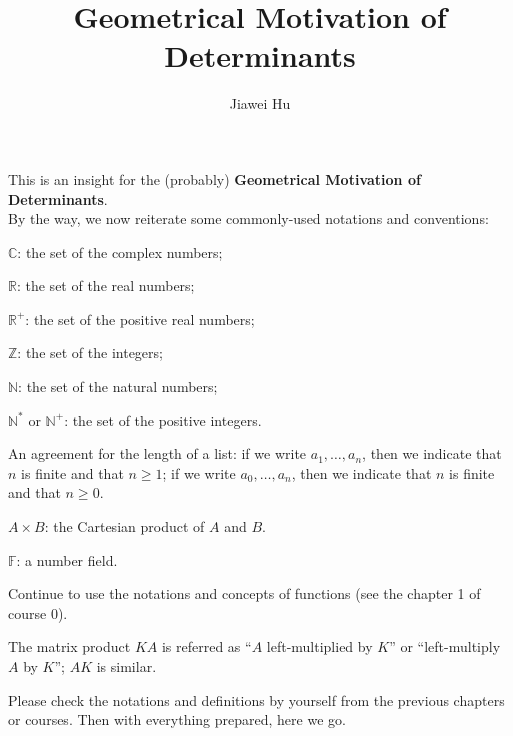 \documentclass{article}
\title{\LARGE \textbf{Geometrical Motivation of Determinants}}
\author{\large Jiawei Hu}
\begin{document}
\maketitle
\tableofcontents
\newpage

This is an insight for the (probably) \textbf{Geometrical Motivation of Determinants}. \\ 
By the way, we now reiterate some commonly-used notations and conventions:
\begin{compactenum}
    \item $\mathbb{C}$: the set of the complex numbers;
    \item $\mathbb{R}$: the set of the real numbers;
    \item $\mathbb{R}^+$: the set of the positive real numbers;
    \item $\mathbb{Z}$: the set of the integers;
    \item $\mathbb{N}$: the set of the natural numbers;
    \item $\mathbb{N^\ast}$ or $\mathbb{N}^+$: the set of the positive integers.
    \item An agreement for the length of a list: if we write $a_1, \dots, a_n$, then we indicate that $n$ is finite and that $n\geq 1$; if we write $a_0, \dots, a_n$, then we indicate that $n$ is finite and that $n\geq 0$.
    \item $A\times B$: the Cartesian product of $A$ and $B$.
    \item $\mathbb{F}$: a number field.
    \item Continue to use the notations and concepts of functions (see the chapter 1 of course 0).
    \item The matrix product $KA$ is referred as ``$A$ left-multiplied by $K$'' or ``left-multiply $A$ by $K$''; $AK$ is similar.
\end{compactenum} 
Please check the notations and definitions by yourself from the previous chapters or courses. Then with everything prepared, here we go.
\end{document}
